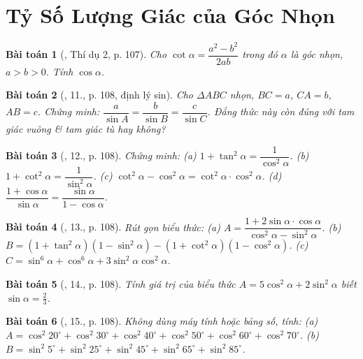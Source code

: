 \documentclass{article}
\newtheorem{baitoan}{Bài toán}
\begin{document}

\section{Tỷ Số Lượng Giác của Góc Nhọn}

\begin{baitoan}[\cite{Tuyen_Toan_9}, Thí dụ 2, p. 107]
	Cho $\cot\alpha = \dfrac{a^2 - b^2}{2ab}$ trong đó $\alpha$ là góc nhọn, $a > b > 0$. Tính $\cos\alpha$.
\end{baitoan}

\begin{baitoan}[\cite{Tuyen_Toan_9}, 11., p. 108, định lý sin]
	Cho $\Delta ABC$ nhọn, $BC = a$, $CA = b$, $AB = c$. Chứng minh: $\dfrac{a}{\sin A} = \dfrac{b}{\sin B} = \dfrac{c}{\sin C}$. Đẳng thức này còn đúng với tam giác vuông \& tam giác tù hay không?
\end{baitoan}

\begin{baitoan}[\cite{Tuyen_Toan_9}, 12., p. 108]
	Chứng minh: (a) $1 + \tan^2\alpha = \dfrac{1}{\cos^2\alpha}$. (b) $1 + \cot^2\alpha = \dfrac{1}{\sin^2\alpha}$. (c) $\cot^2\alpha - \cos^2\alpha = \cot^2\alpha\cdot\cos^2\alpha$. (d) $\dfrac{1 + \cos\alpha}{\sin\alpha} = \dfrac{\sin\alpha}{1 - \cos\alpha}$.
\end{baitoan}

\begin{baitoan}[\cite{Tuyen_Toan_9}, 13., p. 108]
	Rút gọn biểu thức: (a) $A = \dfrac{1 + 2\sin\alpha\cdot\cos\alpha}{\cos^2\alpha - \sin^2\alpha}$. (b) $B = (1 + \tan^2\alpha)(1 - \sin^2\alpha) - (1 + \cot^2\alpha)(1 - \cos^2\alpha)$. (c) $C = \sin^6\alpha + \cos^6\alpha + 3\sin^2\alpha\cos^2\alpha$.
\end{baitoan}

\begin{baitoan}[\cite{Tuyen_Toan_9}, 14., p. 108]
	Tính giá trị của biểu thức $A = 5\cos^2\alpha + 2\sin^2\alpha$ biết $\sin\alpha = \frac{2}{3}$.
\end{baitoan}

\begin{baitoan}[\cite{Tuyen_Toan_9}, 15., p. 108]
	Không dùng máy tính hoặc bảng số, tính: (a) $A = \cos^2 20^\circ + \cos^2 30^\circ + \cos^2 40^\circ + \cos^2 50^\circ + \cos^2 60^\circ + \cos^2 70^\circ$. (b) $B = \sin^2 5^\circ + \sin^2 25^\circ + \sin^2 45^\circ + \sin^2 65^\circ + \sin^2 85^\circ$.
\end{baitoan}
\end{document}
